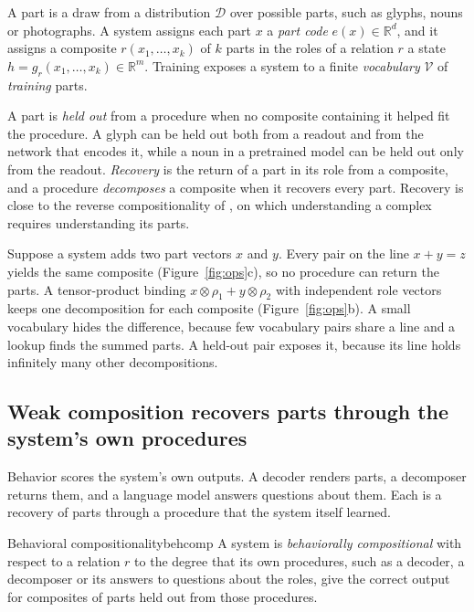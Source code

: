 \documentclass[10pt]{article}
\theoremstyle{plain}
\theoremstyle{remark}
\newcommand{\R}{\mathbb{R}}
\newcommand{\D}{\mathcal{D}}
\newcommand{\Voc}{\mathcal{V}}
\begin{document}
A part is a draw from a distribution $\D$ over possible parts, such as glyphs, nouns or photographs. A system assigns each part $x$ a \emph{part code} $e(x) \in \R^d$, and it assigns a composite $r(x_1, \ldots, x_k)$ of $k$ parts in the roles of a relation $r$ a state $h = g_r(x_1, \ldots, x_k) \in \R^m$. Training exposes a system to a finite \emph{vocabulary} $\Voc$ of \emph{training} parts.

A part is \emph{held out} from a procedure when no composite containing it helped fit the procedure. A glyph can be held out both from a readout and from the network that encodes it, while a noun in a pretrained model can be held out only from the readout. \emph{Recovery} is the return of a part in its role from a composite, and a procedure \emph{decomposes} a composite when it recovers every part. Recovery is close to the reverse compositionality of \citet{fodor2002}, on which understanding a complex requires understanding its parts.

Suppose a system adds two part vectors $x$ and $y$. Every pair on the line $x + y = z$ yields the same composite (Figure~\ref{fig:ops}c), so no procedure can return the parts. A tensor-product binding $x \otimes \rho_1 + y \otimes \rho_2$ with independent role vectors \citep{smolensky1990} keeps one decomposition for each composite (Figure~\ref{fig:ops}b). A small vocabulary hides the difference, because few vocabulary pairs share a line and a lookup finds the summed parts. A held-out pair exposes it, because its line holds infinitely many other decompositions.

\subsection{Weak composition recovers parts through the system's own procedures}
\label{sec:notions}

Behavior scores the system's own outputs. A decoder renders parts, a decomposer returns them, and a language model answers questions about them. Each is a recovery of parts through a procedure that the system itself learned.

\begin{defbox}{Behavioral compositionality}{behcomp}
A system is \emph{behaviorally compositional} with respect to a relation $r$ to the degree that its own procedures, such as a decoder, a decomposer or its answers to questions about the roles, give the correct output for composites of parts held out from those procedures.
\end{defbox}
\end{document}
